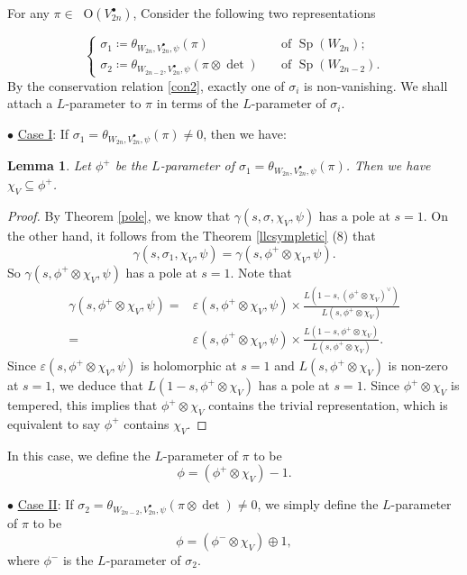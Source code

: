 \documentclass[article]{article}
\numberwithin{equation}{section}
\newtheorem{lemma}[theorem]{Lemma}
\theoremstyle{definition}
\DeclareMathOperator{\SP}{Sp}
\DeclareMathOperator{\Irrt}{Irr_{temp}}
\begin{document}
For any $\pi\in \Irrt \mathrm O(V^\bullet_{2n})$, Consider the following two representations

\begin{equation}\label{con}
\begin{cases}
\sigma_1\coloneqq\theta_{W_{2n}, V^\bullet_{2n} ,\psi}(\pi)\quad &\mbox{of}\,\, \SP(W_{2n});\\
\sigma_2\coloneqq\theta_{W_{2n-2}, V^\bullet_{2n}, \psi}(\pi\otimes \det)\quad &\mbox{of}\,\, \SP(W_{2n-2}).
\end{cases}
\end{equation}
By the conservation relation \ref{con2}, exactly one of $\sigma_{i}$ is non-vanishing. We shall attach a $L$-parameter to $\pi$ in terms of the $L$-parameter of $\sigma_{i}$. 


$\bullet$ \underline{Case I}: If $\sigma_1=\theta_{W_{2n}, V^\bullet_{2n}, \psi}(\pi)\neq 0$, then we have: 
	\begin{lemma}
		Let $\phi^+$ be the $L$-parameter of $\sigma_1=\theta_{W_{2n}, V^\bullet_{2n}, \psi}(\pi)$. Then we have $\chi_{V}\subseteq \phi^+$. 
	\end{lemma}
	\begin{proof}
		By Theorem \ref{pole}, we know that $\gamma(s,\sigma, \chi_V, \psi)$ has a pole at $s=1$. On the other hand, it follows from the Theorem \ref{llcsympletic} (8) that 
		$$\gamma(s,\sigma_1, \chi_V, \psi)= \gamma(s,\phi^+\otimes\chi_V,\psi).$$ 
		So $\gamma(s,\phi^+ \otimes\chi_V,\psi)$ has a pole at $s=1$. Note that  
		\begin{align*}
		\gamma(s,\phi^+ \otimes\chi_V,\psi)=&\varepsilon(s,\phi^+\otimes \chi_V,\psi)\times \frac{L(1-s,(\phi^+ \otimes\chi_V)^\vee)}{L(s,\phi^+\otimes\chi_V)}\\
		=&\varepsilon(s,\phi^+\otimes \chi_V,\psi)\times \frac{L(1-s,\phi^+ \otimes\chi_V)}{L(s,\phi^+\otimes\chi_V)}.
		\end{align*}
		Since $\varepsilon(s,\phi^+ \otimes\chi_V,\psi)$ is holomorphic at $s=1$ and $L(s,\phi^+\otimes \chi_V)$ is non-zero at $s=1$, we deduce that $L(1-s,\phi^+ \otimes\chi_V)$ has a pole at $s=1$. Since $\phi^+\otimes\chi_{V}$ is tempered, this implies that $\phi^+\otimes\chi_V$ contains the trivial representation, which is equivalent to say $\phi^+$ contains $\chi_{V}$.
	\end{proof}
	In this case, we define the $L$-parameter of $\pi$ to be 
	$$\phi=(\phi^+\otimes\chi_V) -\mathrm 1.$$
	
$\bullet$ \underline{Case II}: If $\sigma_2=\theta_{W_{2n-2}, V^\bullet_{2n}, \psi}(\pi\otimes \det)\neq 0 $, we simply define the $L$-parameter of $\pi$ to be 
	$$
	\phi=(\phi^{-} \otimes\chi_{V})\oplus \mathrm{1},
	$$
	where $\phi^{-}$ is the $L$-parameter of $\sigma_2$. 
\end{document}
